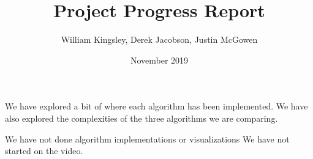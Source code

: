 \documentclass{article}
\title{Project Progress Report}
\author{William Kingsley, Derek Jacobson, Justin McGowen}
\date{November 2019}
\begin{document}
\maketitle

\section{}

We have explored a bit of where each algorithm has been implemented. We have also explored the complexities of the three algorithms we are comparing.

We have not done algorithm implementations or visualizations
We have not started on the video.
\end{document}
